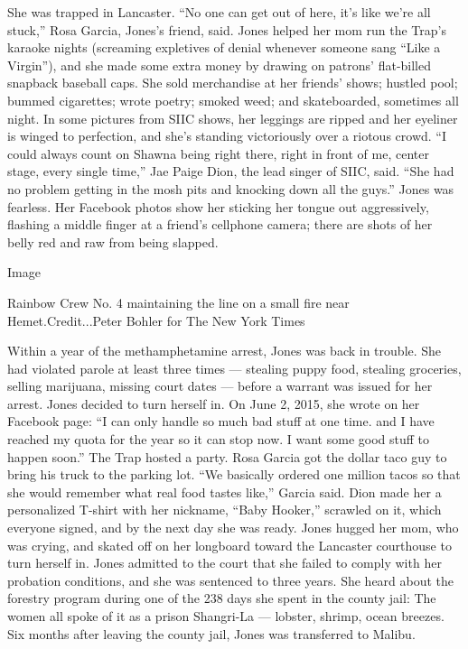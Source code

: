 She was trapped in Lancaster. ``No one can get out of here, it's like
we're all stuck,'' Rosa Garcia, Jones's friend, said. Jones helped her
mom run the Trap's karaoke nights (screaming expletives of denial
whenever someone sang ``Like a Virgin''), and she made some extra money
by drawing on patrons' flat-billed snapback baseball caps. She sold
merchandise at her friends' shows; hustled pool; bummed cigarettes;
wrote poetry; smoked weed; and skateboarded, sometimes all night. In
some pictures from SIIC shows, her leggings are ripped and her eyeliner
is winged to perfection, and she's standing victoriously over a riotous
crowd. ``I could always count on Shawna being right there, right in
front of me, center stage, every single time,'' Jae Paige Dion, the lead
singer of SIIC, said. ``She had no problem getting in the mosh pits and
knocking down all the guys.'' Jones was fearless. Her Facebook photos
show her sticking her tongue out aggressively, flashing a middle finger
at a friend's cellphone camera; there are shots of her belly red and raw
from being slapped.

Image

Rainbow Crew No. 4 maintaining the line on a small fire near
Hemet.Credit...Peter Bohler for The New York Times

Within a year of the methamphetamine arrest, Jones was back in trouble.
She had violated parole at least three times --- stealing puppy food,
stealing groceries, selling marijuana, missing court dates --- before a
warrant was issued for her arrest. Jones decided to turn herself in. On
June 2, 2015, she wrote on her Facebook page: ``I can only handle so
much bad stuff at one time. and I have reached my quota for the year so
it can stop now. I want some good stuff to happen soon.'' The Trap
hosted a party. Rosa Garcia got the dollar taco guy to bring his truck
to the parking lot. ``We basically ordered one million tacos so that she
would remember what real food tastes like,'' Garcia said. Dion made her
a personalized T-shirt with her nickname, ``Baby Hooker,'' scrawled on
it, which everyone signed, and by the next day she was ready. Jones
hugged her mom, who was crying, and skated off on her longboard toward
the Lancaster courthouse to turn herself in. Jones admitted to the court
that she failed to comply with her probation conditions, and she was
sentenced to three years. She heard about the forestry program during
one of the 238 days she spent in the county jail: The women all spoke of
it as a prison Shangri-La --- lobster, shrimp, ocean breezes. Six months
after leaving the county jail, Jones was transferred to Malibu.

